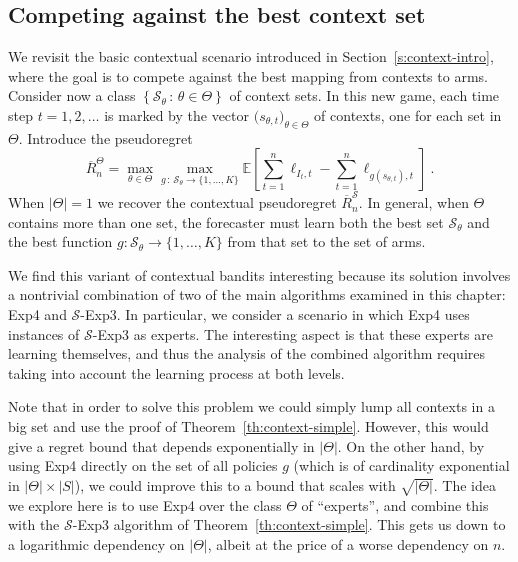 \documentclass[11pt]{hackednow}
\newcommand{\E}{\mathbb{E}}
\newcommand{\cS}{\mathcal{S}}
\newcommand{\oR}{\overline{R}}
\newcommand{\theset}[2]{\left\{{#1}\,:\,{#2}\right\}}
\newcommand{\oRS}{\oR^{\cS}}
\begin{document}
\subsection{Competing against the best context set}
\label{ss:best-context}
%
We revisit the basic contextual scenario introduced in Section~\ref{s:context-intro}, where the goal is to compete against the best mapping from contexts to arms. Consider now a class $\theset{\cS_{\theta}}{\theta\in\Theta}$ of context sets. In this new game, each time step $t=1,2,\dots$ is marked by the vector $\bigl(s_{\theta,t}\bigr)_{\theta\in\Theta}$ of contexts, one for each set in $\Theta$. Introduce the pseudoregret
\[
	\oR^{\Theta}_n = \max_{\theta\in\Theta} \max_{g \,:\, \cS_{\theta}\to\{1,\dots,K\}} \E\left[ \sum_{t=1}^n \ell_{I_t,t} - \sum_{t=1}^n \ell_{g(s_{\theta,t}),t} \right]~.
\]
When $|\Theta|=1$ we recover the contextual pseudoregret $\oRS_n$. In general, when $\Theta$ contains more than one set, the forecaster must learn both the best set $\cS_{\theta}$ and the best function $g : \cS_{\theta}\to\{1,\dots,K\}$ from that set to the set of arms.

We find this variant of contextual bandits interesting because its solution involves a nontrivial combination of two of the main algorithms examined in this chapter: Exp4 and $\cS$-Exp3. In particular, we consider a scenario in which Exp4 uses instances of $\cS$-Exp3 as experts. The interesting aspect is that these experts are learning themselves, and thus the analysis of the combined algorithm requires taking into account the learning process at both levels.

Note that in order to solve this problem we could simply lump all contexts in a big set and use the proof of Theorem~\ref{th:context-simple}. However, this would give a regret bound that depends exponentially in $|\Theta|$. On the other hand, by using Exp4 directly on the set of all policies $g$ (which is of cardinality exponential in $|\Theta|\times|S|$), we could improve this to a bound that scales with $\sqrt{|\Theta|}$. The idea we explore here is to use Exp4 over the class $\Theta$ of ``experts'', and combine this with the $\cS$-Exp3 algorithm of Theorem~\ref{th:context-simple}. This gets us down to a logarithmic dependency on $|\Theta|$, albeit at the price of a worse dependency on $n$.
\end{document}
